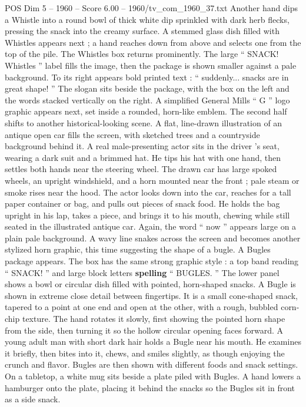 \begin{textsample}{POS Dim 5 – 1960 – Score 6.00 – 1960/tv\_com\_1960\_37.txt}
Another hand dips a Whistle into a round bowl of thick white dip sprinkled with dark herb flecks, pressing the snack into the creamy surface.
A stemmed glass dish filled with Whistles appears next ; a hand reaches down from above and selects one from the top of the pile.
The Whistles box returns prominently.
The large “ SNACK!
Whistles ” label fills the image, then the package is shown smaller against a pale background.
To its right appears bold printed text : “ suddenly... snacks are in great shape! ” The slogan sits beside the package, with the box on the left and the words stacked vertically on the right.
A simplified General Mills “ G ” logo graphic appears next, set inside a rounded, horn-like emblem.
The second half shifts to another historical-looking scene.
A flat, line-drawn illustration of an antique open car fills the screen, with sketched trees and a countryside background behind it.
A real male-presenting actor sits in the driver ’s seat, wearing a dark suit and a brimmed hat.
He tips his hat with one hand, then settles both hands near the steering wheel.
The drawn car has large spoked wheels, an upright windshield, and a horn mounted near the front ; pale steam or smoke rises near the hood.
The actor looks down into the car, reaches for a tall paper container or bag, and pulls out pieces of snack food.
He holds the bag upright in his lap, takes a piece, and brings it to his mouth, chewing while still seated in the illustrated antique car.
Again, the word “ now ” appears large on a plain pale background.
A wavy line snakes across the screen and becomes another stylized horn graphic, this time suggesting the shape of a bugle.
A Bugles package appears.
The box has the same strong graphic style : a top band reading “ SNACK! ” and large block letters \textbf{spelling} “ BUGLES. ” The lower panel shows a bowl or circular dish filled with pointed, horn-shaped snacks.
A Bugle is shown in extreme close detail between fingertips.
It is a small cone-shaped snack, tapered to a point at one end and open at the other, with a rough, bubbled corn-chip texture.
The hand rotates it slowly, first showing the pointed horn shape from the side, then turning it so the hollow circular opening faces forward.
A young adult man with short dark hair holds a Bugle near his mouth.
He examines it briefly, then bites into it, chews, and smiles slightly, as though enjoying the crunch and flavor.
Bugles are then shown with different foods and snack settings.
On a tabletop, a white mug sits beside a plate piled with Bugles.
A hand lowers a hamburger onto the plate, placing it behind the snacks so the Bugles sit in front as a side snack.

\end{textsample}
